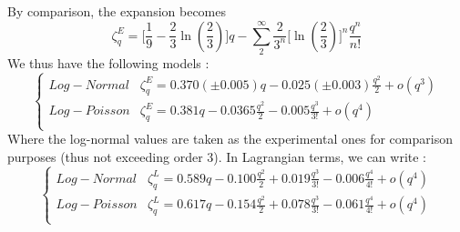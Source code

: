 By comparison, the expansion becomes
\begin{equation}
    \zeta_q^E=\bigg[\frac{1}{9}-\frac{2}{3}\ln\left(\frac{2}{3}\right)\bigg]q-\sum_2^\infty\frac{2}{3^n}\bigg[\ln\left(\frac{2}{3}\right)\bigg]^n\frac{q^n}{n!}
\end{equation}
We thus have the following models :
\begin{equation}
    \begin{cases}
    Log-Normal&\displaystyle\zeta_q^E=0.370(\pm0.005)q-0.025(\pm0.003)\frac{q^2}{2}+o(q^3)\\
    Log-Poisson&\displaystyle\zeta_q^E=0.381q-0.0365\frac{q^2}{2}-0.005\frac{q^3}{3!}+o(q^4)\\
    \end{cases}
\end{equation}
Where the log-normal values are taken as the experimental ones for comparison purposes (thus not exceeding order 3).
In Lagrangian terms, we can write :
\begin{equation}
    \begin{cases}
    Log-Normal&\displaystyle\zeta_q^L=0.589q-0.100\frac{q^2}{2}+0.019\frac{q^3}{3!}-0.006\frac{q^4}{4!}+o(q^4)\\
    Log-Poisson&\displaystyle\zeta_q^L=0.617q-0.154\frac{q^2}{2}+0.078\frac{q^3}{3!}-0.061\frac{q^4}{4!}+o(q^4)\\
    \end{cases}
\end{equation}
